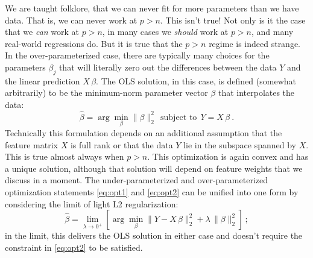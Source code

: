 \documentclass[12pt,letterpaper]{article}
\newcommand{\sectionname}{Section}
\begin{document}
We are taught folklore, that we can never fit for more parameters than we have data. That is, we can never work at $p>n$.
This isn't true!
Not only is it the case that we \emph{can} work at $p>n$, in many cases we \emph{should} work at $p>n$, and many real-world regressions do.
But it is true that the $p>n$ regime is indeed strange.
In the over-parameterized case, there are typically many choices for the parameters $\beta_j$ that will literally zero out the differences between the data $Y$ and the linear prediction $X\,\beta$.
The OLS solution, in this case, is defined (somewhat arbitrarily) to be the minimum-norm parameter vector $\beta$ that interpolates the data:
\begin{equation}\label{eq:opt2}
    \hat{\beta} = \arg\min_\beta \|\beta\|_2^2 ~~\mbox{subject to}~~ Y = X\,\beta
    ~.
\end{equation}
Technically this formulation depends on an additional assumption that the feature matrix $X$ is full rank or that the data $Y$ lie in the subspace spanned by $X$.
This is true almost always when $p>n$.
This optimization is again convex and has a unique solution, although that solution will depend on feature weights that we discuss in a moment.
The under-parameterized and over-parameterized optimization statements \eqref{eq:opt1} and \eqref{eq:opt2} can be unified into one form by considering the limit of light L2 regularization:
\begin{equation}\label{eq:opt3}
    \hat{\beta} = \lim_{\lambda\to 0^+}\left[\arg\min_\beta \|Y - X\,\beta\|_2^2 + \lambda\,\|\beta\|_2^2\right]
    ~;
\end{equation}
in the limit, this delivers the OLS solution in either case and doesn't require the constraint in \eqref{eq:opt2} to be satisfied.
\end{document}
